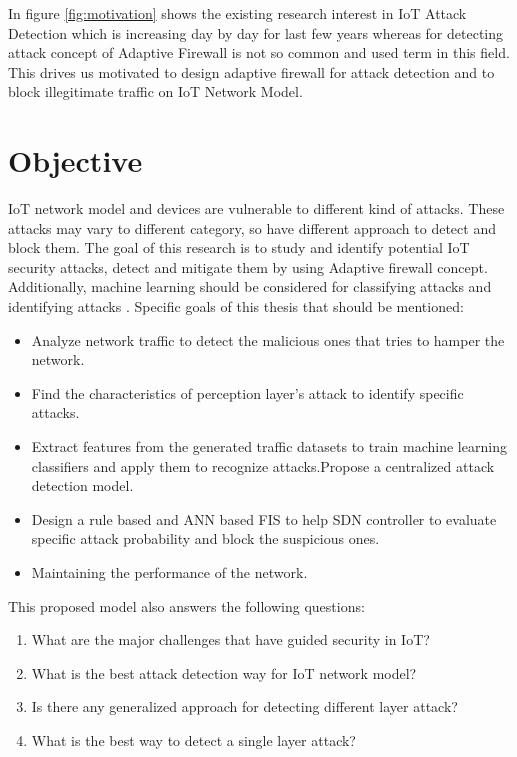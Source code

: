  In figure \ref{fig:motivation} shows the existing research interest in IoT Attack Detection which is increasing day by day for last few years whereas for detecting attack concept of Adaptive Firewall is not so common and used term in this field. This drives us motivated to design adaptive firewall for attack detection and to block illegitimate traffic on IoT Network Model.
\section{Objective}
IoT network model and devices are vulnerable to different kind of attacks. These attacks may vary to different category, so have different approach to detect and block them. The goal of this research is to study and identify potential IoT security attacks, detect and mitigate them by using Adaptive firewall concept. Additionally, machine learning should be considered for classifying attacks and identifying attacks \cite{c4}.
Specific goals of this thesis that should be mentioned:

\begin{itemize}
    \item Analyze network traffic to detect the malicious ones that tries to hamper the network.
    \item Find the characteristics of perception layer’s attack to identify specific attacks.
    \item Extract features from the generated traffic datasets to train machine learning classifiers and apply them to recognize attacks.Propose a centralized attack detection model.
    \item Design a rule based and ANN based FIS to help SDN controller to evaluate specific attack probability and block the suspicious ones.
    \item Maintaining the performance of the network.
\end{itemize}

This proposed model also answers the following questions:
\begin{enumerate}
    \item What are the major challenges that have guided security in IoT?
    \item What is the best attack detection way for IoT network model?
    \item Is there any generalized approach for detecting different layer attack?
    \item What is the best way to detect a single layer attack?
\end{enumerate}

